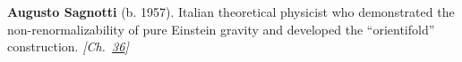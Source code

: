 \textbf{Augusto Sagnotti} (b. 1957). Italian theoretical physicist who demonstrated the non-renormalizability of pure Einstein gravity and developed the ``orientifold'' construction. \emph{[Ch.~\hyperref[ch:qftvsgr]{36}]}

